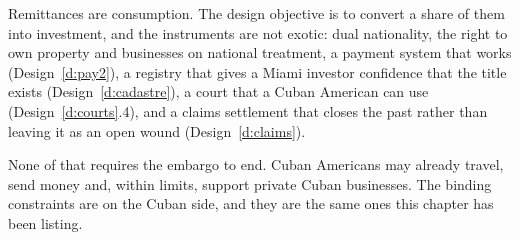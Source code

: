 Remittances are consumption. The design objective is to convert a share of them
into investment, and the instruments are not exotic: dual nationality, the right
to own property and businesses on national treatment, a payment system that works
(Design~\ref{d:pay2}), a registry that gives a Miami investor confidence that the
title exists (Design~\ref{d:cadastre}), a court that a Cuban American can use
(Design~\ref{d:courts}.4), and a claims settlement that closes the past rather
than leaving it as an open wound (Design~\ref{d:claims}).

None of that requires the embargo to end. Cuban Americans may already travel,
send money and, within limits, support private Cuban businesses. The binding
constraints are on the Cuban side, and they are the same ones this chapter has
been listing.
